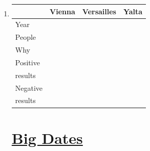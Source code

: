 \documentclass[12pt]{article}
\begin{document}
\begin{enumerate}
\item \begin{tabular}{|l|l|l|l|} 

\hline
& Vienna & Versailles & Yalta \\
\hline
Year & & & \\
\hline
People & & & \\
\hline
Why & & & \\
\hline
Positive & & & \\
results & & & \\
\hline
Negative & & & \\
results & & & \\
\hline
\end{tabular}
\section{\underline{Big Dates}}



\end{enumerate}
\end{document}
